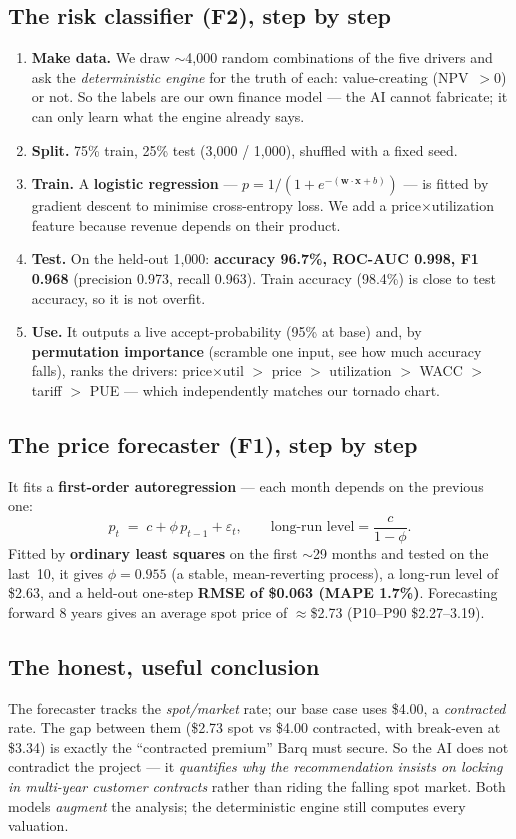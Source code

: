 \documentclass[11pt,a4paper]{article}
\newcommand{\term}[1]{\textcolor{tvblue}{\textbf{#1}}}
\begin{document}
\subsection{The risk classifier (F2), step by step}
\begin{enumerate}
  \item \textbf{Make data.} We draw $\sim$4{,}000 random combinations of the five drivers and ask the
  \emph{deterministic engine} for the truth of each: value-creating (NPV~$>0$) or not. So the labels
  are our own finance model --- the AI cannot fabricate; it can only learn what the engine already
  says.
  \item \textbf{Split.} 75\% train, 25\% test (3{,}000 / 1{,}000), shuffled with a fixed seed.
  \item \textbf{Train.} A \term{logistic regression} --- $p = 1/(1+e^{-(\mathbf{w}\cdot\mathbf{x}+b)})$
  --- is fitted by gradient descent to minimise cross-entropy loss. We add a price$\times$utilization
  feature because revenue depends on their product.
  \item \textbf{Test.} On the held-out 1{,}000: \textbf{accuracy 96.7\%, ROC-AUC 0.998, F1 0.968}
  (precision 0.973, recall 0.963). Train accuracy (98.4\%) is close to test accuracy, so it is not
  overfit.
  \item \textbf{Use.} It outputs a live accept-probability (95\% at base) and, by \term{permutation
  importance} (scramble one input, see how much accuracy falls), ranks the drivers:
  price$\times$util $>$ price $>$ utilization $>$ WACC $>$ tariff $>$ PUE --- which independently
  matches our tornado chart.
\end{enumerate}

\subsection{The price forecaster (F1), step by step}
It fits a \term{first-order autoregression} --- each month depends on the previous one:
\[
  p_t \;=\; c + \phi\,p_{t-1} + \varepsilon_t, \qquad
  \text{long-run level} = \frac{c}{1-\phi}.
\]
Fitted by \term{ordinary least squares} on the first $\sim$29 months and tested on the last~10, it
gives $\phi=0.955$ (a stable, mean-reverting process), a long-run level of \$2.63, and a held-out
one-step \textbf{RMSE of \$0.063 (MAPE 1.7\%)}. Forecasting forward 8 years gives an average spot
price of $\approx$\$2.73 (P10--P90 \$2.27--3.19).

\subsection{The honest, useful conclusion}
The forecaster tracks the \emph{spot/market} rate; our base case uses \$4.00, a \emph{contracted}
rate. The gap between them (\$2.73 spot vs \$4.00 contracted, with break-even at \$3.34) is exactly
the ``contracted premium'' Barq must secure. So the AI does not contradict the project --- it
\emph{quantifies why the recommendation insists on locking in multi-year customer contracts} rather
than riding the falling spot market. Both models \emph{augment} the analysis; the deterministic engine
still computes every valuation.
\end{document}
